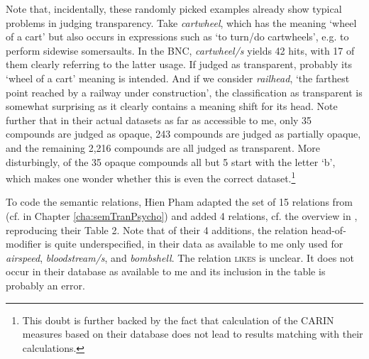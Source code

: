 \pagebreak[4]
Note that, incidentally, these randomly picked examples already show
typical problems in judging transparency. Take \emph{cartwheel},
which has the meaning `wheel of a cart' but also occurs
in expressions such as `to turn/do cartwheels', e.g. to perform
sidewise somersaults. In the BNC, \emph{cartwheel/s} yields 42
hits, with 17 of them clearly referring to the latter usage. If judged
as transparent, probably its `wheel of a cart' meaning is
intended. And if we consider
\emph{railhead}, `the farthest point reached by a railway under
construction', the classification as transparent is somewhat
surprising as it clearly contains a meaning shift for its head. Note further
that in their actual datasets as far as accessible to me, only 35
compounds are judged as opaque, 243 compounds are judged as partially opaque, and the
remaining 2,216 compounds are all judged as transparent. More disturbingly, of the 35 opaque
compounds all but 5 start with the letter `b', which makes one
wonder whether this is even the correct dataset.\footnote{This doubt
  is further backed by the fact that calculation of the CARIN measures
based on their database does not lead to results matching with their calculations.}

To code the semantic relations, Hien Pham adapted  the set of 15 relations
from \citet{GagneandShoben:1997} (cf. 
 in Chapter
\ref{cha:semTranPsycho})  and added 4 
relations, cf. the overview in , reproducing their Table 2. Note that of their 4 additions, the relation head-of-modifier is quite underspecified, in their data as available to me only used for \emph{airspeed}, \emph{bloodstream/s}, and \emph{bombshell}. The relation \textsc{likes} is unclear. It does not occur in their database as available to me and its inclusion in the table is probably an error. 

